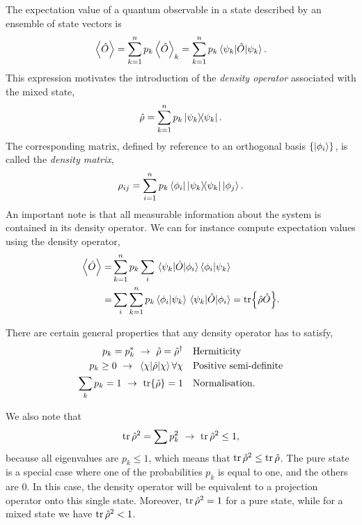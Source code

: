     The expectation value of a quantum observable in a state described by an ensemble of state
    vectors is 
    \begin{equation}
        \ev{\hat{O}} = \sum_{k=1}^n p_k \ev{\hat{O}}_k = \sum_{k=1}^n p_k \mel{\psi_k}{\hat{O}}{\psi_k}.
    \end{equation}
    This expression motivates the introduction of the \emph{density operator} associated with 
    the mixed state,
    \begin{equation}
        \hat{\rho} = \sum_{k=1}^n p_k \dyad{\psi_k}.
    \end{equation}
    The corresponding matrix, defined by reference to an orthogonal basis $\{\ket{\phi_i}\}$,
    is called the \emph{density matrix},
    \begin{equation}
        \rho_{ij} = \sum_{i=1}^n p_k \bra{\phi_i}\dyad{\psi_k}\ket{\phi_j}.
    \end{equation}
    An important note is that all measurable information about the system is contained in its 
    density operator. We can for instance compute expectation values using the density operator,
    \begin{equation}
        \begin{aligned}
        \ev{\hat{O}}
            =& \sum_{k=1}^n p_k \sum_i \mel{\psi_k}{\hat{O}}{\phi_i} \braket{\phi_i}{\psi_k} \\
            =& \sum_i \sum_{k=1}^n p_k \braket{\phi_i}{\psi_k} \mel{\psi_k}{\hat{O}}{\phi_i}
            = \tr{\hat{\rho}\hat{O}}.
        \end{aligned}
    \end{equation}
    
    There are certain general properties that any density operator has to satisfy,
    \begin{equation}
        \begin{aligned}
        p_k = p_k^*\ \to\ \hat{\rho}=\hat{\rho}^\dagger &\quad
            \text{Hermiticity} \\
        p_k \geq 0\ \to\ \mel{\chi}{\hat{\rho}}{\chi} \forall \chi &\quad 
            \text{Positive semi-definite} \\
        \sum_k p_k = 1\ \to \ \tr{\hat{\rho}} = 1 &\quad 
            \text{Normalisation}.
        \end{aligned}
    \end{equation}     

    We also note that
    \begin{equation}
        \tr \hat{\rho}^2 = \sum p_k^2 \ \to \ \tr \hat{\rho}^2 \leq 1,
    \end{equation}
    because all eigenvalues are $p_k \leq 1$, which means that $\tr \hat{\rho}^2 \leq \tr \hat{\rho}$.
    The pure state is a special case where one of the probabilities $p_k$ is equal to one, and the others 
    are $0$. In this case, the density operator will be equivalent to a projection operator onto this single 
    state. Moreover, $\tr\hat{\rho}^2 = 1$ for a pure state, while for a mixed state we have 
    $\tr\hat{\rho}^2 <1$.